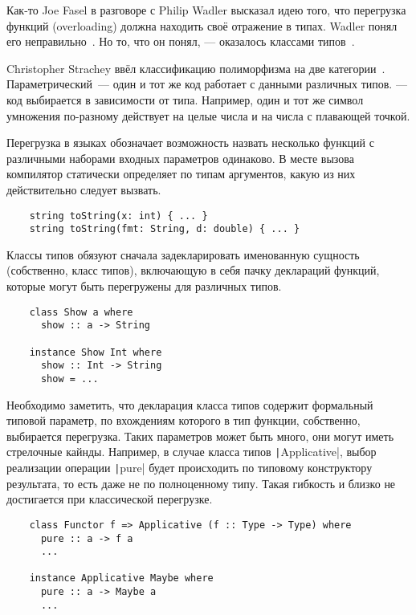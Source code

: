 
Как-то Joe Fasel в разговоре с Philip Wadler высказал идею того, что перегрузка функций (overloading) должна находить своё отражение в типах.
Wadler понял его неправильно~\cite{hudak2007history}.
Но то, что он понял, --- оказалось классами типов~\cite{wadler1989make}.

Christopher Strachey ввёл классификацию полиморфизма на две категории~\cite{strachey2000fundamental}.
Параметрический~--- один и тот же код работает с данными различных типов.
 --- код выбирается в зависимости от типа.
Например, один и тот же символ умножения по-разному действует на целые числа и на числа с плавающей точкой.

Перегрузка в языках обозначает возможность назвать несколько функций с различными наборами входных параметров одинаково.
В месте вызова компилятор статически определяет по типам аргументов, какую из них действительно следует вызвать.
\begin{verbatim}
    string toString(x: int) { ... }
    string toString(fmt: String, d: double) { ... }
\end{verbatim}

Классы типов обязуют сначала задекларировать именованную сущность (собственно, класс типов), включающую в себя пачку деклараций функций, которые могут быть перегружены для различных типов.
\begin{verbatim}
    class Show a where
      show :: a -> String

    instance Show Int where
      show :: Int -> String
      show = ...
\end{verbatim}

Необходимо заметить, что декларация класса типов содержит формальный типовой параметр, по вхождениям которого в тип функции, собственно, выбирается перегрузка.
Таких параметров может быть много, они могут иметь стрелочные кайнды.
Например, в случае класса типов \texttt|Applicative|, выбор реализации операции \texttt|pure| будет происходить по типовому конструктору результата, то есть даже не по полноценному типу.
Такая гибкость и близко не достигается при классической перегрузке.
\begin{verbatim}
    class Functor f => Applicative (f :: Type -> Type) where
      pure :: a -> f a
      ...

    instance Applicative Maybe where
      pure :: a -> Maybe a
      ...
\end{verbatim}

